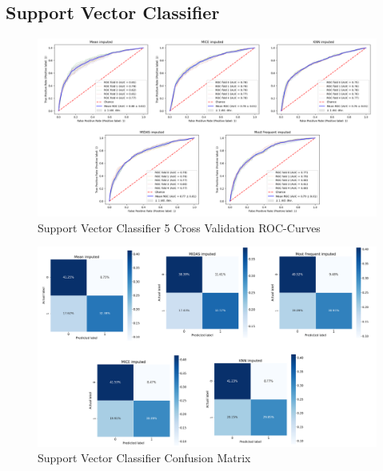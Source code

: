 \documentclass{l4proj}
\begin{document}
\begin{appendices}
\pagebreak
\subsection{Support Vector Classifier}
\label{appendix:svcresults}
 \begin{figure}[!h]
  \caption{Support Vector Classifier 5 Cross Validation ROC-Curves}
  \includegraphics[width=\textwidth]{dissertation/Latex/images/Classification Results/svm_roc.PNG}
\end{figure}

\begin{figure}[!h]
  \caption{Support Vector Classifier Confusion Matrix}
  \includegraphics[width=\textwidth]{dissertation/Latex/images/Classification Results/svm_cm.PNG}
\end{figure}
\pagebreak


\end{appendices}
\end{document}
